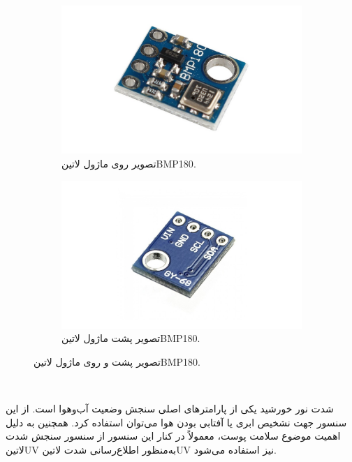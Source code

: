 \begin{figure}[!h]
	\begin{subfigure}{0.5\linewidth}
		\includegraphics[width=\linewidth]{Assets/BMP180front.jpg}
		\caption{تصویر روی ماژول ‌لاتین{BMP180}.}
		\label{fig:BMP180front}
	\end{subfigure}
	\begin{subfigure}{0.5\linewidth}
		\includegraphics[width=\linewidth]{Assets/BMP180back.png}
		\caption{تصویر پشت ماژول ‌لاتین{BMP180}.}
		\label{fig:BMP180back}
	\end{subfigure}
	\caption{تصویر پشت و روی ماژول ‌لاتین{BMP180}.}
	\label{fig:BMP180}
\end{figure}

‌

شدت نور خورشید یکی از پارامترهای اصلی سنجش وضعیت آب‌وهوا است. از این سنسور جهت نشخیص ابری یا آفتابی بودن هوا می‌توان استفاده کرد. همچنین به دلیل اهمیت موضوع سلامت پوست، معمولاً در کنار این سنسور از سنسور سنجش شدت ‌لاتین{UV} به‌منظور اطلاع‌رسانی شدت ‌لاتین{UV} نیز استفاده می‌شود. 


